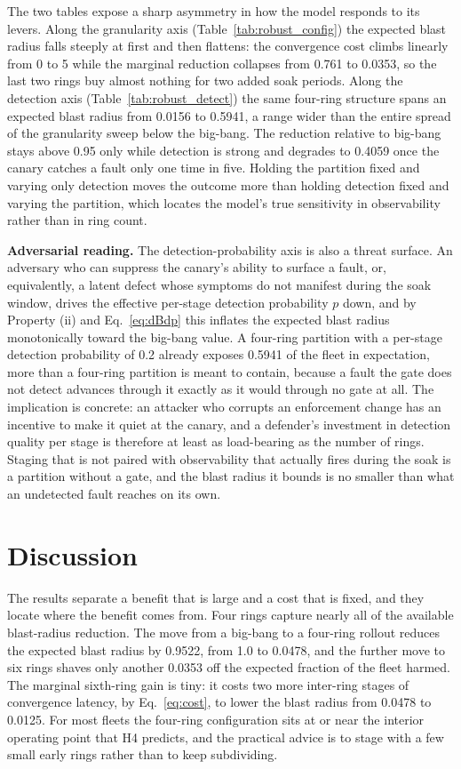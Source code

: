 \documentclass[journal]{IEEEtran}
\begin{document}
The two tables expose a sharp asymmetry in how the model responds to its levers. Along the granularity
axis (Table~\ref{tab:robust_config}) the expected blast radius falls steeply at first and then flattens:
the convergence cost climbs linearly from 0 to 5 while the marginal reduction collapses from 0.761 to
0.0353, so the last two rings buy almost nothing for two added soak periods. Along the detection axis
(Table~\ref{tab:robust_detect}) the same four-ring structure spans an expected blast radius from 0.0156
to 0.5941, a range wider than the entire spread of the granularity sweep below the big-bang. The
reduction relative to big-bang stays above 0.95 only while detection is strong and degrades to 0.4059
once the canary catches a fault only one time in five. Holding the partition fixed and varying only
detection moves the outcome more than holding detection fixed and varying the partition, which locates
the model's true sensitivity in observability rather than in ring count.

\textbf{Adversarial reading.} The detection-probability axis is also a threat surface. An adversary
who can suppress the canary's ability to surface a fault, or, equivalently, a latent defect whose
symptoms do not manifest during the soak window, drives the effective per-stage detection probability
$p$ down, and by Property (ii) and Eq.~\eqref{eq:dBdp} this inflates the expected blast radius
monotonically toward the big-bang value. A four-ring partition with a per-stage detection probability
of 0.2 already exposes 0.5941 of the fleet in expectation, more than a four-ring partition is meant to
contain, because a fault the gate does not detect advances through it exactly as it would through no
gate at all. The implication is concrete: an attacker who corrupts an enforcement change has an
incentive to make it quiet at the canary, and a defender's investment in detection quality per stage
is therefore at least as load-bearing as the number of rings. Staging that is not paired with
observability that actually fires during the soak is a partition without a gate, and the blast radius
it bounds is no smaller than what an undetected fault reaches on its own.

\section{Discussion}
The results separate a benefit that is large and a cost that is fixed, and they locate where the
benefit comes from. Four rings capture nearly all of the available blast-radius reduction. The move
from a big-bang to a four-ring rollout reduces the expected blast radius by 0.9522, from 1.0 to
0.0478, and the further move to six rings shaves only another 0.0353 off the expected fraction of the
fleet harmed. The marginal sixth-ring gain is tiny: it costs two more inter-ring stages of
convergence latency, by Eq.~\eqref{eq:cost}, to lower the blast radius from 0.0478 to 0.0125. For
most fleets the four-ring configuration sits at or near the interior operating point that H4
predicts, and the practical advice is to stage with a few small early rings rather than to keep
subdividing.
\end{document}
